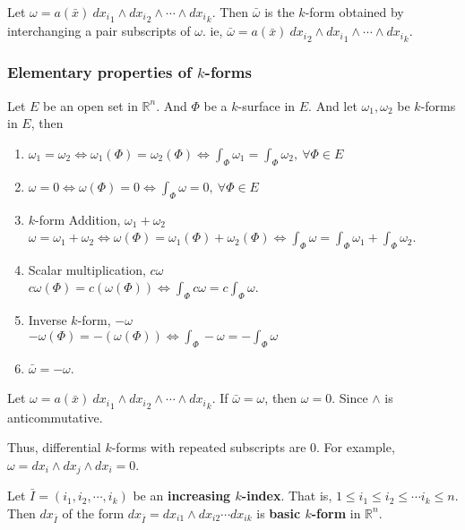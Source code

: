 \begin{definition}
	Let $\omega = a(\bar{x})\ {dx_i}_1 \wedge {dx_i}_2 \wedge \cdots \wedge {dx_i}_k$.
	Then \textbf{$\bar{\omega}$} is the $k$-form obtained by interchanging a pair subscripts of $\omega$.
	ie, $\bar{\omega} = a(\bar{x})\ {dx_i}_2 \wedge {dx_i}_1 \wedge \cdots \wedge {dx_i}_k$. 
\end{definition}

\subsubsection{Elementary properties of $k$-forms}
\begin{definition}
	Let $E$ be an open set in $\mathbb{R}^n$.
	And $\Phi$ be a $k$-surface in $E$.
	And let $\omega_1,\omega_2$ be $k$-forms in $E$, then
	\begin{enumerate}
		\item $\omega_1 = \omega_2 \iff \omega_1(\Phi) = \omega_2(\Phi) \iff \int_\Phi \omega_1 = \int_\Phi \omega_2,\ \forall \Phi \in E$
		\item $\omega = 0 \iff \omega(\Phi) = 0 \iff \int_\Phi \omega = 0,\ \forall \Phi \in E$
		\item $k$-form Addition, $\omega_1+\omega_2$ \\
			$\omega = \omega_1 + \omega_2 \iff \omega(\Phi) = \omega_1(\Phi) + \omega_2(\Phi) \iff \int_\Phi \omega = \int_\Phi \omega_1 + \int_\Phi \omega_2$.
		\item Scalar multiplication, $c\omega$ \\
			$c\omega(\Phi) = c(\omega(\Phi)) \iff \int_\Phi c\omega = c\int_\Phi \omega$.
		\item Inverse $k$-form, $-\omega$ \\
			$-\omega(\Phi) = -(\omega(\Phi)) \iff \int_\Phi -\omega = -\int_\Phi \omega$
		\item $\bar{\omega} = -\omega$.
	\end{enumerate}
\end{definition}

\begin{remark}
	Let $\omega = a(\bar{x})\ {dx_i}_1 \wedge {dx_i}_2 \wedge \cdots \wedge {dx_i}_k$. If $\bar{\omega} = \omega$, then $\omega = 0$. Since $\wedge$ is anticommutative.

	Thus, differential $k$-forms with repeated subscripts are $0$.
	For example, $\omega = dx_i \wedge dx_j \wedge dx_i = 0$.
\end{remark}

\begin{definition}
	Let $\bar{I} = (i_1,i_2,\cdots,i_k)$ be an \textbf{increasing $k$-index}.
	That is, $1 \le i_1 \le i_2 \le \cdots i_k \le n$.
	Then $dx_{\bar{I}}$ of the form $dx_{\bar{I}} = dx_{i1} \wedge dx_{i2} \cdots dx_{ik}$ is \textbf{basic $k$-form} in $\mathbb{R}^n$.
\end{definition}

